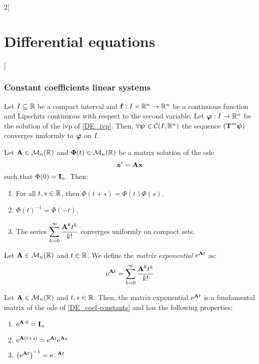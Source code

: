 \documentclass[../../../main.tex]{subfiles}
\begin{document}
\begin{multicols}{2}[\section{Differential equations}]
    \subsubsection{Constant coefficients linear systems}
    \begin{lemma}
        Let $I\subseteq\mathbb{R}$ be a compact interval and $\boldsymbol{\mathrm{f}}:I\times\mathbb{R}^n\rightarrow\mathbb{R}^n$ be a continuous function and Lipschitz continuous with respect to the second variable. Let $\boldsymbol{\mathrm{\varphi}}:I\rightarrow\mathbb{R}^n$ be the solution of the ivp of \cref{DE_ivp}. Then, $\forall\boldsymbol{\mathrm{\psi}}\in\mathcal{C}(I,\mathbb{R}^n)$ the sequence $(\boldsymbol{\mathrm{T}}^m\boldsymbol{\mathrm{\psi}})$ converges uniformly to $\boldsymbol{\mathrm{\varphi}}$ on $I$.
    \end{lemma}
    \begin{theorem}
        Let $\boldsymbol{\mathrm{A}}\in\mathcal{M}_n(\mathbb{R})$ and $\boldsymbol{\mathrm{\Phi}}(t)\in\mathcal{M}_n(\mathbb{R})$ be a matrix solution of the ode
        \begin{equation}\label{DE_coef-constants}
            \boldsymbol{\mathrm{x}}'=\boldsymbol{\mathrm{A}}\boldsymbol{\mathrm{x}}
        \end{equation}
        such that $\Phi(0)=\boldsymbol{\mathrm{I}}_n$. Then:
        \begin{enumerate}
            \item For all $t,s\in\mathbb{R}$, then $\Phi(t+s)=\Phi(t)\Phi(s)$.
            \item ${\Phi(t)}^{-1}=\Phi(-t)$.
            \item The series $\displaystyle\sum_{k=0}^\infty \frac{\boldsymbol{\mathrm{A}}^kt^k}{k!}$ converges uniformly on compact sets.
        \end{enumerate}
    \end{theorem}
    \begin{definition}
        Let $\boldsymbol{\mathrm{A}}\in\mathcal{M}_n(\mathbb{R})$ and $t\in\mathbb{R}$. We define the \textit{matrix exponential} $\mathrm{e}^{\boldsymbol{\mathrm{A}}t}$ as: $$\mathrm{e}^{\boldsymbol{\mathrm{A}}t}=\sum_{k=0}^\infty\frac{\boldsymbol{\mathrm{A}}^kt^k}{k!}$$
    \end{definition}
    \begin{prop}
        Let $\boldsymbol{\mathrm{A}}\in\mathcal{M}_n(\mathbb{R})$ and $t,s\in \mathbb{R}$. Then, the matrix exponential $\mathrm{e}^{\boldsymbol{\mathrm{A}}t}$ is a fundamental matrix of the ode of \cref{DE_coef-constants} and has the following properties:
        \begin{enumerate}
            \item $\mathrm{e}^{\boldsymbol{\mathrm{A}}\cdot 0}=\boldsymbol{\mathrm{I}}_n$
            \item $\mathrm{e}^{\boldsymbol{\mathrm{A}}(t+s)}=\mathrm{e}^{\boldsymbol{\mathrm{A}}t}\mathrm{e}^{\boldsymbol{\mathrm{A}}s}$
            \item ${\left(\mathrm{e}^{\boldsymbol{\mathrm{A}}t}\right)}^{-1}=\mathrm{e}^{-\boldsymbol{\mathrm{A}}t}$

\end{enumerate}
\end{prop}
\end{multicols}
\end{document}
